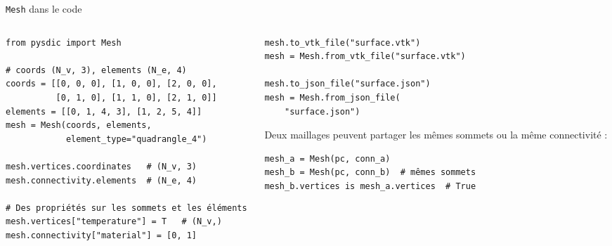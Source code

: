\documentclass[aspectratio=169,11pt]{beamer}
\newcommand{\code}[1]{\texttt{\small #1}}
\newcommand{\cls}[1]{\textcolor{pyblue}{\texttt{#1}}}
\begin{document}
\begin{frame}[fragile]{\texttt{Mesh} dans le code}
  \begin{columns}[T]
    \begin{column}{0.52\textwidth}
\begin{lstlisting}
from pysdic import Mesh
 
# coords (N_v, 3), elements (N_e, 4)
coords = [[0, 0, 0], [1, 0, 0], [2, 0, 0],
          [0, 1, 0], [1, 1, 0], [2, 1, 0]]
elements = [[0, 1, 4, 3], [1, 2, 5, 4]]
mesh = Mesh(coords, elements,
            element_type="quadrangle_4")
 
mesh.vertices.coordinates   # (N_v, 3)
mesh.connectivity.elements  # (N_e, 4)
 
# Des propriétés sur les sommets et les éléments
mesh.vertices["temperature"] = T   # (N_v,)
mesh.connectivity["material"] = [0, 1]
\end{lstlisting}
    \end{column}
    \begin{column}{0.44\textwidth}
\begin{lstlisting}
mesh.to_vtk_file("surface.vtk")
mesh = Mesh.from_vtk_file("surface.vtk")
 
mesh.to_json_file("surface.json")
mesh = Mesh.from_json_file(
    "surface.json")
\end{lstlisting}
      \vspace{-4pt}
      \scriptsize Deux maillages peuvent partager les \alert{mêmes sommets} ou la
      \alert{même connectivité} :
\begin{lstlisting}[basicstyle=\ttfamily\tiny]
mesh_a = Mesh(pc, conn_a)
mesh_b = Mesh(pc, conn_b)  # mêmes sommets
mesh_b.vertices is mesh_a.vertices  # True
\end{lstlisting}
      \centering
    \end{column}
  \end{columns}
\end{frame}
 
\end{document}
